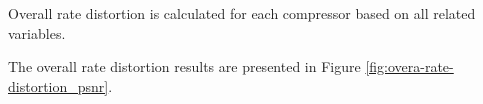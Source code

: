 
Overall rate distortion is calculated for each compressor based on all related variables.

The overall rate distortion results are presented in Figure \ref{fig:overa-rate-distortion_psnr}.

